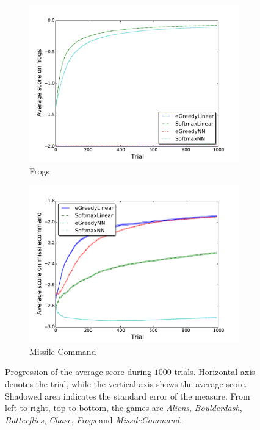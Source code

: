 \documentclass[conference]{IEEEtran}
\begin{document}
\begin{figure}[!t]
\begin{center}
\begin{subfigure} {\lefig\textwidth}
	\includegraphics[width = \textwidth]{img/frogs_scores}
  \caption{Frogs}
\end{subfigure}\begin{subfigure} {\lefig\textwidth}
	\includegraphics[width = \textwidth]{img/missilecommand_scores}  
  \caption{Missile Command}
\end{subfigure}
	\caption{Progression of the average score during $1000$ trials. Horizontal axis denotes the trial, while the vertical axis shows the average score. Shadowed area indicates the standard error of the measure. From left to right, top to bottom, the games are \textit{Aliens}, \textit{Boulderdash}, \textit{Butterflies}, \textit{Chase}, \textit{Frogs} and \textit{MissileCommand}.}
	\label{fig:results1}
	\end{center}
\end{figure}
\end{document}

